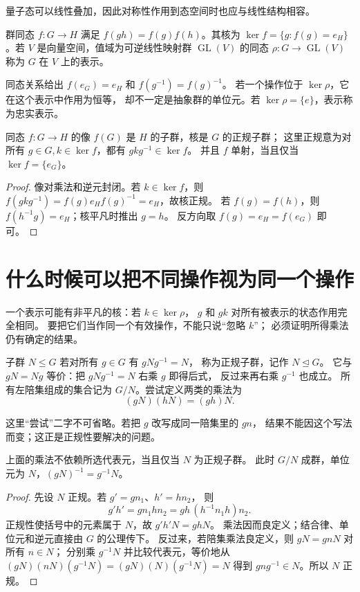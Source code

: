 量子态可以线性叠加，因此对称性作用到态空间时也应与线性结构相容。
\begin{definition}[群同态与线性表示]
群同态 \(f:G\to H\) 满足 \(f(gh)=f(g)f(h)\)。其核为
\(\ker f=\{g:f(g)=e_H\}\)。若 \(V\) 是向量空间，值域为可逆线性映射群
\(\operatorname{GL}(V)\) 的同态
\(\rho:G\to\operatorname{GL}(V)\) 称为 \(G\) 在 \(V\) 上的表示。
\end{definition}

同态关系给出 \(f(e_G)=e_H\) 和 \(f(g^{-1})=f(g)^{-1}\)。
若一个操作位于 \(\ker\rho\)，它在这个表示中作用为恒等，
却不一定是抽象群的单位元。若 \(\ker\rho=\{e\}\)，表示称为忠实表示。

\begin{proposition}[像、核与单射]
同态 \(f:G\to H\) 的像 \(f(G)\) 是 \(H\) 的子群，核是 \(G\) 的正规子群；
这里正规意为对所有 \(g\in G,k\in\ker f\)，都有 \(gkg^{-1}\in\ker f\)。
并且 \(f\) 单射，当且仅当 \(\ker f=\{e_G\}\)。
\end{proposition}
\begin{proof}
像对乘法和逆元封闭。若 \(k\in\ker f\)，则
\(f(gkg^{-1})=f(g)e_Hf(g)^{-1}=e_H\)，故核正规。
若 \(f(g)=f(h)\)，则 \(f(h^{-1}g)=e_H\)；核平凡时推出 \(g=h\)。
反方向取 \(f(g)=e_H=f(e_G)\) 即可。
\end{proof}

\section{什么时候可以把不同操作视为同一个操作}

一个表示可能有非平凡的核：若 \(k\in\ker\rho\)，
\(g\) 和 \(gk\) 对所有被表示的状态作用完全相同。
要把它们当作同一个有效操作，不能只说“忽略 \(k\)”；
必须证明所得乘法仍有确定的结果。

\begin{definition}[正规子群与商群的候选元素]
子群 \(N\leq G\) 若对所有 \(g\in G\) 有 \(gNg^{-1}=N\)，
称为正规子群，记作 \(N\trianglelefteq G\)。
它与 \(gN=Ng\) 等价：把 \(gNg^{-1}=N\) 右乘 \(g\) 即得后式，
反过来再右乘 \(g^{-1}\) 也成立。
所有左陪集组成的集合记为 \(G/N\)。尝试定义两类的乘法为
\[(gN)(hN)=(gh)N.\]
\end{definition}

这里“尝试”二字不可省略。若把 \(g\) 改写成同一陪集里的 \(gn\)，
结果不能因这个写法而变；这正是正规性要解决的问题。

\begin{theorem}[商群的良定义性]
上面的乘法不依赖所选代表元，当且仅当 \(N\) 为正规子群。
此时 \(G/N\) 成群，单位元为 \(N\)，\((gN)^{-1}=g^{-1}N\)。
\end{theorem}
\begin{proof}
先设 \(N\) 正规。若 \(g'=gn_1\)、\(h'=hn_2\)，
则
\[
g'h'=gn_1hn_2
=gh\,(h^{-1}n_1h)n_2.
\]
正规性使括号中的元素属于 \(N\)，故 \(g'h'N=ghN\)。
乘法因而良定义；结合律、单位元和逆元直接由 \(G\) 的公理传下。
反过来，若陪集乘法良定义，则 \(gN=g n N\) 对所有 \(n\in N\)；
分别乘 \(g^{-1}N\) 并比较代表元，等价地从
\((gN)(nN)(g^{-1}N)=(gN)(N)(g^{-1}N)=N\)
得到 \(gng^{-1}\in N\)。所以 \(N\) 正规。
\end{proof}

